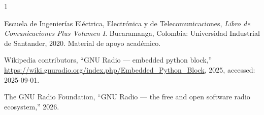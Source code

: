 \documentclass[twocolumn]{IEEEtran}
\begin{document}
\nocite{*}
\begin{thebibliography}{1}

Escuela de Ingenierías Eléctrica, Electrónica y de Telecomunicaciones, 
\emph{Libro de Comunicaciones Plus Volumen I}. 
Bucaramanga, Colombia: Universidad Industrial de Santander, 2020. Material de apoyo académico.

Wikipedia contributors, ``GNU Radio --- embedded python block,'' 
\url{https://wiki.gnuradio.org/index.php/Embedded_Python_Block}, 
2025, accessed: 2025-09-01.

The GNU Radio Foundation, ``GNU Radio --- the free and open software radio ecosystem,'' 2026.

\end{thebibliography}
\end{document}
